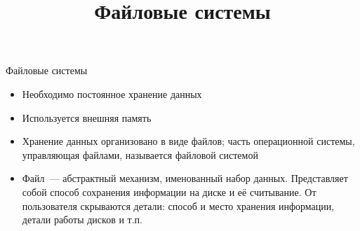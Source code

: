 \documentclass[aspectratio=169,14pt]{beamer}
\title{Файловые системы}
\begin{document}
\begin{frame}{Файловые системы}
    \begin{itemize}
        \item Необходимо постоянное хранение данных
        \item Используется внешняя память
        \item Хранение данных организовано в виде файлов; часть операционной
        системы, управляющая файлами, называется файловой системой
        \item Файл~--- абстрактный механизм, именованный набор данных.
        Представляет собой способ сохранения информации на диске и её
        считывание. От пользователя скрываются детали: способ и место
        хранения информации, детали работы дисков и т.п.
    \end{itemize}
\end{frame}
\end{document}
